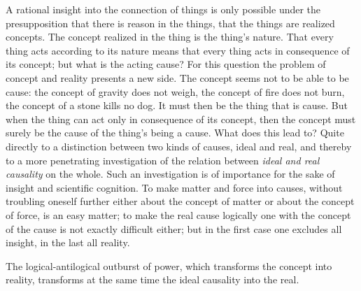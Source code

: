 \documentclass[12pt]{article}
\begin{document}
A rational insight into the connection of things is only possible under the
presupposition that there is reason in the things, that the things are
realized concepts. The concept realized in the thing is the thing's nature.
That every thing acts according to its nature means that every thing acts in
consequence of its concept; but what is the acting cause? For this question
the problem of concept and reality presents a new side. The concept seems
not to be able to be cause: the concept of gravity does not weigh, the
concept of fire does not burn, the concept of a stone kills no dog. It must
then be the thing that is cause. But when the thing can act only in
consequence of its concept, then the concept must surely be the cause of the
thing's being a cause. What does this lead to? Quite directly to a
distinction between two kinds of causes, ideal and real, and thereby to a
more penetrating investigation of the relation between \emph{ideal and real
causality} on the whole. Such an investigation is of importance for the sake
of insight and scientific cognition. To make matter and force into causes,
without troubling oneself further either about the concept of matter or about
the concept of force, is an easy matter; to make the real cause logically one
with the concept of the cause is not exactly difficult either; but in the
first case one excludes all insight, in the last all reality.

The logical-antilogical outburst of power, which transforms the concept into
reality, transforms at the same time the ideal causality into the real.
\end{document}
